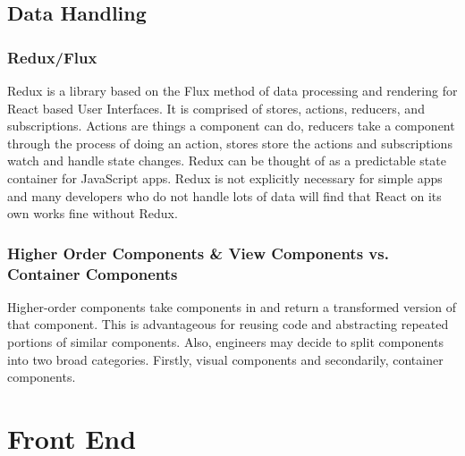 \documentclass[draftclsnofoot, onecolumn, letterpaper,10pt,compsoc]{IEEEtran}
\begin{document}
\subsection{Data Handling}

\subsubsection{Redux/Flux}
Redux is a library based on the Flux method of data processing and rendering for React based User Interfaces. It is comprised of stores, actions, reducers, and subscriptions. Actions are things a component can do, reducers take a component through the process of doing an action, stores store the actions and subscriptions watch and handle state changes. Redux can be thought of as a predictable state container for JavaScript apps. Redux is not explicitly necessary for simple apps and many developers who do not handle lots of data will find that React on its own works fine without Redux. 

\subsubsection{Higher Order Components \& View Components vs. Container Components}
Higher-order components take components in and return a transformed version of that component. This is advantageous for reusing code and abstracting repeated portions of similar components. Also, engineers may decide to split components into two broad categories. Firstly, visual components and secondarily, container components.

\newpage
\section{Front End}
\end{document}
